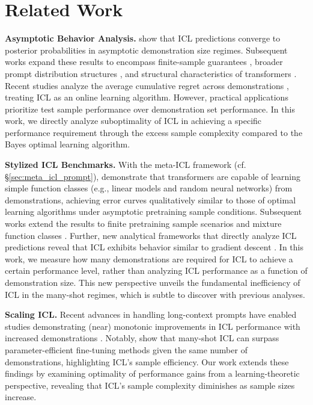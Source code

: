\section{Related Work}
\textbf{Asymptotic Behavior Analysis.}
\citet{xie2021explanation} show that ICL predictions converge to posterior probabilities in asymptotic demonstration size regimes. 
Subsequent works expand these results to encompass finite-sample guarantees \citep{li2023transformers,zhang2023and,bai2024transformers}, broader prompt distribution structures \citep{li2023transformers, li2023transformers_topic, zhang2023and}, and structural characteristics of transformers \citep{zhang2023and}. 
Recent studies analyze the average cumulative regret across demonstrations \citep{zhang2023and,jeon2024information}, treating ICL as an online learning algorithm. 
However, practical applications prioritize test sample performance over demonstration set performance.
In this work, we directly analyze suboptimality of ICL in achieving a specific performance requirement through the excess sample complexity compared to the Bayes optimal learning algorithm. 


\textbf{Stylized ICL Benchmarks.}
With the meta-ICL framework (cf. \S \ref{sec:meta_icl_prompt}), \citet{garg2022can} demonstrate that transformers are capable of learning simple function classes (e.g., linear models and random neural networks) from demonstrations, achieving error curves qualitatively similar to those of optimal learning algorithms under asymptotic pretraining sample conditions. 
Subsequent works extend the results to finite pretraining sample scenarios \citep{raventos2024pretraining} and mixture function classes \citep{pathak2023transformers, panwar2023context}. 
Further, new analytical frameworks that directly analyze ICL predictions reveal that ICL exhibits behavior similar to gradient descent \citep{von2023transformers,akyurek2022learning}. 
In this work, we measure how many demonstrations are required for ICL to achieve a certain performance level, rather than analyzing ICL performance as a function of demonstration size.
This new perspective unveils the fundamental inefficiency of ICL in the many-shot regimes, which is subtle to discover with previous analyses.



\textbf{Scaling ICL.}
Recent advances in handling long-context prompts \citep{chen2023extending,su2024roformer,press2021train} have enabled studies demonstrating (near) monotonic improvements in ICL performance with increased demonstrations \citep{li2023_manydems, agarwal2024many, anil2024many}. 
Notably, \citet{bertsch2024context} show that many-shot ICL can surpass parameter-efficient fine-tuning methods \citep{hu2021lora} given the same number of demonstrations, highlighting ICL's sample efficiency. 
Our work extends these findings by examining optimality of performance gains from a learning-theoretic perspective, revealing that ICL's sample complexity diminishes as sample sizes increase.